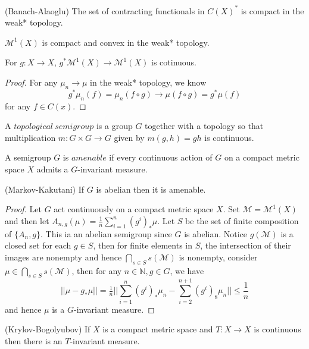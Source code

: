 \documentclass[lang=en, color=blue, ]{elegantbook}
\newcommand{\N}{\mathbb{N}}
\newcommand{\M}{\mathcal{M}}
\begin{document}
\begin{theorem}
    (Banach-Alaoglu) The set of contracting functionals in $C(X)^*$ is compact in the weak* topology.
\end{theorem}

\begin{corollary}
    $\M^1(X)$ is compact and convex in the weak* topology.
\end{corollary}

\begin{proposition}
    For $g:X\to X$, $g^* \M^1(X) \to \M^1(X)$ is cotinuous.
\end{proposition}
\begin{proof}\par
    For any $\mu_n \to \mu$ in the weak* topology, we know
    \[g^*\mu_n(f) = \mu_n(f\circ g) \to \mu(f\circ g) = g^*\mu(f) \]
    for any $f\in C(x)$.
\end{proof}

\begin{definition}
    A $topological\ semigroup$ is a group $G$ together with a topology so that multiplication $m:G\times G \to G$ given by $m(g,h) = gh$ is continuous.\par
    A semigroup $G$ is $amenable$ if every continuous action of $G$ on a compact metric space $X$ admits a $G$-invariant measure.
\end{definition}

\begin{lemma}
    (Markov-Kakutani) If $G$ is abelian then it is amenable.
\end{lemma}

\begin{proof}\par
    Let $G$ act continuously on a compact metric space $X$. Set $\M = \M^1(X)$ and then let $A_{n,g}(\mu) = \tfrac{1}{n} \sum\limits_{i=1}^n (g^i)_* \mu$. Let $S$ be the set of finite composition of $\{A_n,g\}$. This ia an abelian semigroup since $G$ is abelian. Notice $g(\M)$ is a closed set for each $g\in S$, then for finite elements in $S$, the intersection of their images are nonempty and hence $\bigcap_{s\in S} s(\M)$ is nonempty, consider $\mu \in \bigcap_{s\in S} s(\M)$, then for any $n\in \N, g\in G$, we have
    \[||\mu - g_*\mu|| = \tfrac{1}{n}||\sum\limits_{i=1}^n (g^i)_* \mu_n - \sum\limits_{i=2}^{n+1}(g^i)_8 \mu_n|| \leq \dfrac{1}{n}\]
    and hence $\mu$ is a $G$-invariant measure.
\end{proof}

\begin{corollary}
(Krylov-Bogolyubov) If $X$ is a compact metric space and $T:X\to X$ is continuous then there is an $T$-invariant measure.
\end{corollary}
\end{document}
